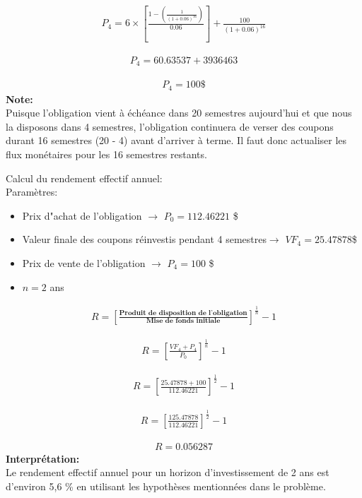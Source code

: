\documentclass[10pt,a4paper]{article}
\begin{document}
\begin{align*}
P_4=6 \times \left[\frac{1-\left( \frac{1}{(1+0.06)^{16}}\right)}{0.06} \right] +\frac{100}{(1+0.06)^{16}}
\end{align*}

\begin{align*}
P_4=60.63537+3936463
\end{align*}

\begin{align*}
P_4=100\$
\end{align*}
\textbf{Note:} \\Puisque l'obligation vient à échéance dans 20 semestres aujourd'hui et que nous la disposons dans 4 semestres, l'obligation continuera de verser des coupons durant 16 semestres (20 - 4) avant d'arriver à terme. Il faut donc actualiser les flux monétaires pour les 16 semestres restants.

\newpage

Calcul du rendement effectif annuel:\\

Paramètres:
\begin{itemize}
\item Prix d"achat de l'obligation $\rightarrow$ $P_0=112.46221$ \$
\item Valeur finale des coupons réinvestis pendant 4 semestres$\rightarrow$ $VF_4=25.47878$\$
\item Prix de vente de l'obligation $\rightarrow$ $P_4=100$ \$
\item $n=2$ ans 
\end{itemize}

\begin{align*}
R= \left[ \frac{\textbf{Produit de disposition de l'obligation}}{\textbf{Mise de fonds initiale}} \right]^{\frac{1}{n}}-1
\end{align*}

\begin{align*}
R= \left[ \frac{VF_4+P_4}{P_0} \right]^{\frac{1}{n}}-1
\end{align*}

\begin{align*}
R= \left[ \frac{25.47878 + 100}{112.46221} \right]^{\frac{1}{2}}-1
\end{align*}

\begin{align*}
R= \left[ \frac{125.47878 }{112.46221} \right]^{\frac{1}{2}}-1
\end{align*}

\begin{align*}
R = 0.056287
\end{align*}
\textbf{Interprétation:} \\ Le rendement effectif annuel pour un horizon d'investissement de 2 ans est d'environ 5,6 \% en utilisant les hypothèses mentionnées dans le problème.
\end{document}
